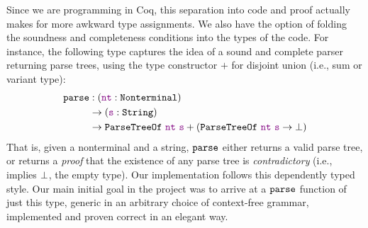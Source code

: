     Since we are programming in Coq, this separation into code and proof actually makes for more awkward type assignments.  We also have the option of folding the soundness and completeness conditions into the types of the code.  For instance, the following type captures the idea of a sound and complete parser returning parse trees, using the type constructor $+$ for disjoint union (i.e., sum or variant type):
    \begin{align*}
      \fname{parse} & \oftypesep
      (\oftype{\farg{nt}}{\Nonterminal}) \\
      & \typeto (\oftype{\farg{s}}{\String}) \\
      & \typeto \indname{ParseTreeOf}~\farg{nt}~\farg{s} + (\indname{ParseTreeOf}~\farg{nt}~\farg{s} \typeto \False)
    \end{align*}
    That is, given a nonterminal and a string, $\texttt{parse}$ either returns a valid parse tree, or returns a \emph{proof} that the existence of any parse tree is \emph{contradictory} (i.e., implies $\bot$, the empty type).  Our implementation follows this dependently typed style.  Our main initial goal in the project was to arrive at a $\texttt{parse}$ function of just this type, generic in an arbitrary choice of context-free grammar, implemented and proven correct in an elegant way.
